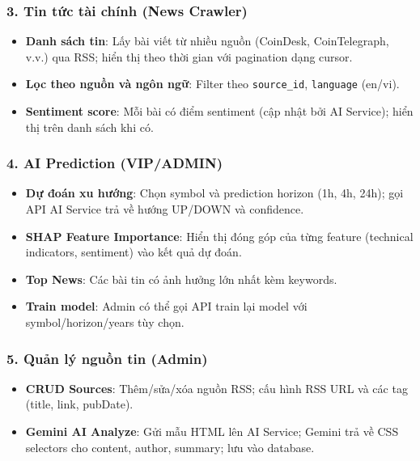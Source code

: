 \subsubsection{3. Tin tức tài chính (News Crawler)}

\begin{itemize}
    \item \textbf{Danh sách tin}: Lấy bài viết từ nhiều nguồn (CoinDesk, CoinTelegraph, v.v.) qua RSS; hiển thị theo thời gian với pagination dạng cursor.
    \item \textbf{Lọc theo nguồn và ngôn ngữ}: Filter theo \texttt{source\_id}, \texttt{language} (en/vi).
    \item \textbf{Sentiment score}: Mỗi bài có điểm sentiment (cập nhật bởi AI Service); hiển thị trên danh sách khi có.
\end{itemize}

\subsubsection{4. AI Prediction (VIP/ADMIN)}

\begin{itemize}
    \item \textbf{Dự đoán xu hướng}: Chọn symbol và prediction horizon (1h, 4h, 24h); gọi API AI Service trả về hướng UP/DOWN và confidence.
    \item \textbf{SHAP Feature Importance}: Hiển thị đóng góp của từng feature (technical indicators, sentiment) vào kết quả dự đoán.
    \item \textbf{Top News}: Các bài tin có ảnh hưởng lớn nhất kèm keywords.
    \item \textbf{Train model}: Admin có thể gọi API train lại model với symbol/horizon/years tùy chọn.
\end{itemize}

\subsubsection{5. Quản lý nguồn tin (Admin)}

\begin{itemize}
    \item \textbf{CRUD Sources}: Thêm/sửa/xóa nguồn RSS; cấu hình RSS URL và các tag (title, link, pubDate).
    \item \textbf{Gemini AI Analyze}: Gửi mẫu HTML lên AI Service; Gemini trả về CSS selectors cho content, author, summary; lưu vào database.
\end{itemize}

